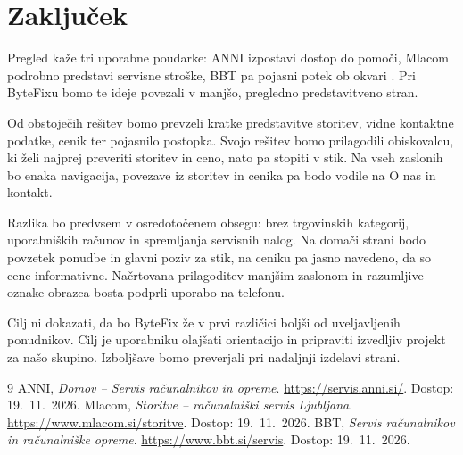 \documentclass[11pt,a4paper]{article}
\begin{document}
\newpage
\section{Zaključek}
Pregled kaže tri uporabne poudarke: ANNI izpostavi dostop do pomoči, Mlacom podrobno predstavi servisne stroške, BBT pa pojasni potek ob okvari \cite{anni,mlacom,bbt}. Pri ByteFixu bomo te ideje povezali v manjšo, pregledno predstavitveno stran.

Od obstoječih rešitev bomo prevzeli kratke predstavitve storitev, vidne kontaktne podatke, cenik ter pojasnilo postopka. Svojo rešitev bomo prilagodili obiskovalcu, ki želi najprej preveriti storitev in ceno, nato pa stopiti v stik. Na vseh zaslonih bo enaka navigacija, povezave iz storitev in cenika pa bodo vodile na O nas in kontakt.

Razlika bo predvsem v osredotočenem obsegu: brez trgovinskih kategorij, uporabniških računov in spremljanja servisnih nalog. Na domači strani bodo povzetek ponudbe in glavni poziv za stik, na ceniku pa jasno navedeno, da so cene informativne. Načrtovana prilagoditev manjšim zaslonom in razumljive oznake obrazca bosta podprli uporabo na telefonu.

Cilj ni dokazati, da bo ByteFix že v prvi različici boljši od uveljavljenih ponudnikov. Cilj je uporabniku olajšati orientacijo in pripraviti izvedljiv projekt za našo skupino. Izboljšave bomo preverjali pri nadaljnji izdelavi strani.

\begin{thebibliography}{9}
 ANNI, \emph{Domov -- Servis računalnikov in opreme}.
\url{https://servis.anni.si/}. Dostop: 19.~11.~2026.
 Mlacom, \emph{Storitve -- računalniški servis Ljubljana}.
\url{https://www.mlacom.si/storitve}. Dostop: 19.~11.~2026.
 BBT, \emph{Servis računalnikov in računalniške opreme}.
\url{https://www.bbt.si/servis}. Dostop: 19.~11.~2026.
\end{thebibliography}
\end{document}
